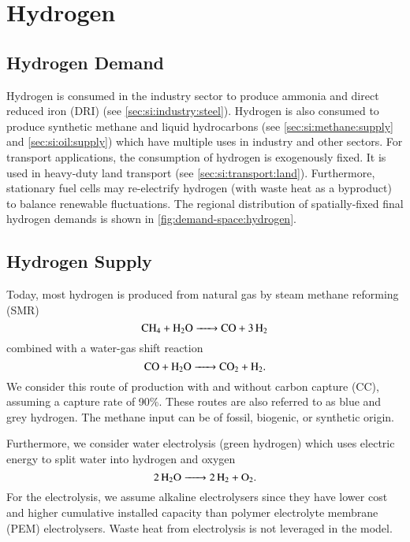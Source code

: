 \section{Hydrogen}
\label{sec:si:h2}

\subsection{Hydrogen Demand}
\label{sec:si:h2:demand}

Hydrogen is consumed in the industry sector to produce ammonia and direct
reduced iron (DRI) (see \cref{sec:si:industry:steel}). Hydrogen is also consumed
to produce synthetic methane and liquid hydrocarbons (see
\cref{sec:si:methane:supply} and \cref{sec:si:oil:supply}) which have multiple
uses in industry and other sectors. For transport applications, the consumption
of hydrogen is exogenously fixed. It is used in heavy-duty land transport (see
\cref{sec:si:transport:land}). Furthermore, stationary fuel cells may
re-electrify hydrogen (with waste heat as a byproduct) to balance renewable
fluctuations. The regional distribution of spatially-fixed final hydrogen
demands is shown in \cref{fig:demand-space:hydrogen}.

\subsection{Hydrogen Supply}
\label{sec:si:h2:supply}

Today, most hydrogen is produced from natural gas by steam methane reforming
(SMR)
\begin{equation}
    \ce{ CH4 + H2O -> CO + 3H2 }
\end{equation}
combined with a water-gas shift reaction
\begin{equation}
    \ce{CO + H2O -> CO2 + H2}.
\end{equation}
We consider this route of production with and without carbon capture (CC),
assuming a capture rate of 90\%. These routes are also referred to as blue and
grey hydrogen. The methane input can be of fossil, biogenic, or synthetic origin.

Furthermore, we consider water electrolysis (green hydrogen) which uses electric
energy to split water into hydrogen and oxygen
\begin{equation}
    \ce{2H2O -> 2 H2 + O2}.
\end{equation}
For the electrolysis, we assume alkaline electrolysers since they have lower
cost  and higher cumulative installed
capacity  than polymer electrolyte membrane
(PEM) electrolysers. Waste heat from electrolysis is not leveraged in the model.

